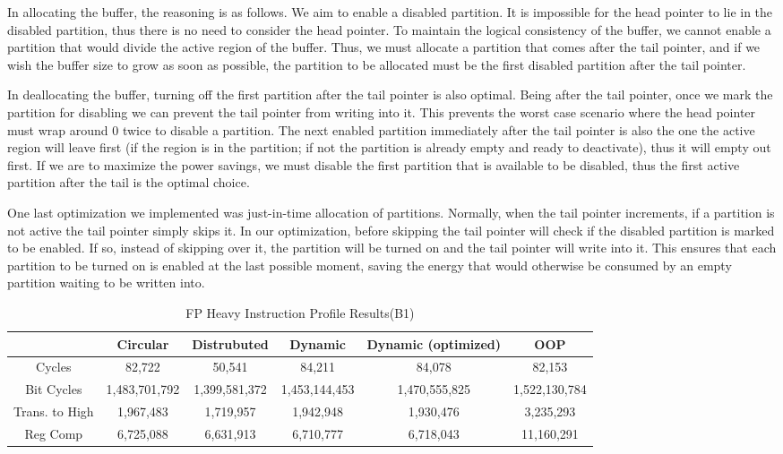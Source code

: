 In allocating the buffer, the reasoning is as follows. We aim to enable a disabled partition. It is impossible for the head pointer to lie in the disabled partition, thus there is no need to consider the head pointer. To maintain the logical consistency of the buffer, we cannot enable a partition that would divide the active region of the buffer. Thus, we must allocate a partition that comes after the tail pointer, and if we wish the buffer size to grow as soon as possible, the partition to be allocated must be the first disabled partition after the tail pointer.

In deallocating the buffer, turning off the first partition after the tail pointer is also optimal. Being after the tail pointer, once we mark the partition for disabling we can prevent the tail pointer from writing into it. This prevents the worst case scenario where the head pointer must wrap around 0 twice to disable a partition. The next enabled partition immediately after the tail pointer is also the one the active region will leave first (if the region is in the partition; if not the partition is already empty and ready to deactivate), thus it will empty out first. If we are to maximize the power savings, we must disable the first partition that is available to be disabled, thus the first active partition after the tail is the optimal choice.

One last optimization we implemented was just-in-time allocation of partitions. Normally, when the tail pointer increments, if a partition is not active the tail pointer simply skips it. In our optimization, before skipping the tail pointer will check if the disabled partition is marked to be enabled. If so, instead of skipping over it, the partition will be turned on and the tail pointer will write into it. This ensures that each partition to be turned on is enabled at the last possible moment, saving the energy that would otherwise be consumed by an empty partition waiting to be written into.

\begin{table*}[!tb]
\centering
\caption{FP Heavy Instruction Profile Results(B1)}
\begin{tabular}{|c|c|c|c|c|c|} \hline
    & Circular  & Distrubuted & Dynamic & Dynamic (optimized) & OOP\\ \hline
Cycles&82,722	&50,541&    	84,211	&84,078&        	82,153\\ \hline
Bit Cycles&1,483,701,792&	1,399,581,372&	1,453,144,453	&1,470,555,825	&1,522,130,784\\ \hline
Trans. to High&1,967,483&	1,719,957	&1,942,948	&1,930,476	&3,235,293\\ \hline
Reg Comp&6,725,088&	6,631,913&	6,710,777&	6,718,043	&11,160,291\\ \hline
\end{tabular}
\label{tab:bench1}
\end{table*}

